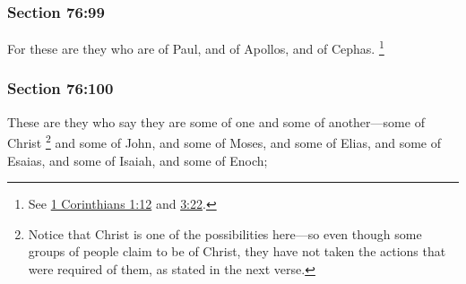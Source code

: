 
	\subsubsection{Section 76:99} %
		\label{DC76-99}

		For these are they who are of Paul, and of Apollos, and of Cephas.%
			\footnote{%
				See \hyperref[1CORINTHIANS-1-12]{1 Corinthians 1:12} and \hyperref[1CORINTHIANS-3-22]{3:22}.
				}


	\subsubsection{Section 76:100} %
		\label{DC76-100}

		These are they who say they are some of one and some of another---some of Christ%
			\footnote{%
				Notice that Christ is one of the possibilities here---so even though some groups of people claim to be of Christ, they have not taken the actions that were required of them, as stated in the next verse.
				}
		and some of John, and some of Moses, and some of Elias, and some of Esaias, and some of Isaiah, and some of Enoch;


